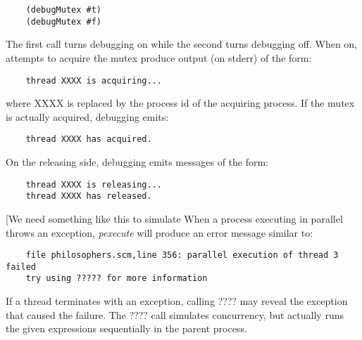 \begin{verbatim}
    (debugMutex #t)
    (debugMutex #f)
\end{verbatim}

The first call turns debugging on while the second turns debugging off. When
on, attempts to acquire the mutex produce output (on stderr) of
the form:

\begin{verbatim}
    thread XXXX is acquiring...
\end{verbatim}

where XXXX is replaced by the process id of the acquiring process.
If the mutex is actually acquired, debugging emits:

\begin{verbatim}
    thread XXXX has acquired.
\end{verbatim}

On the releasing side, debugging emits messages of the form:

\begin{verbatim}
    thread XXXX is releasing...
    thread XXXX has released.
\end{verbatim}

[We need something like this to simulate 
When a process executing in parallel throws an exception, {\it pexecute} will
produce an error message similar to:

\begin{verbatim}
    file philosophers.scm,line 356: parallel execution of thread 3 failed
    try using ????? for more information
\end{verbatim}

If a thread terminates with an exception,
calling ???? may reveal the
exception that caused the failure.
The ???? call simulates concurrency, but actually runs the
given expressions sequentially in the parent process.
